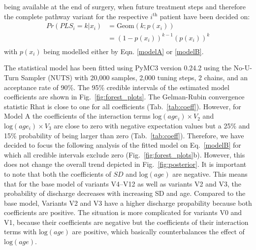  being available at the end of surgery, when future treatment steps and therefore the complete pathway variant for the respective $i^\text{th}$ patient have been decided on:
\begin{equation}
\begin{split}
Pr(PLS_i=k|x_i) & = \text{Geom}\left(k;p(x_i)\right) \\
& = \left(1-p(x_i)\right)^{k-1}\left(p(x_i)\right)^{k} \\
\end{split}
\end{equation}
with $p(x_i)$ being modelled either by Eqn. \eqref{modelA} or
\eqref{modelB}.
    
The statistical model has been fitted using PyMC3
\citep{Salvatier2016_PyMC3} version 0.24.2 using the No-U-Turn Sampler
(NUTS) with 20,000 samples, 2,000 tuning steps, 2 chains, and an
acceptance rate of 90\%. The 95\% credible intervals of the estimated
model coefficients are shown in Fig.~\ref{fig:forest_plots}. The
Gelman-Rubin convergence statistic Rhat is close to one for all
coefficients (Tab.~\ref{tab:coeff}). 
However, for Model A the coefficients of the interaction terms
$\text{log}(age_i)\times V_2$ and $\text{log}(age_i)\times V_3$ are
close to zero with negative expectation values but a 25\% and 15\%
probability of being larger than zero (Tab.~\ref{tab:coeff}). 
Therefore, we have decided to focus the following analysis of the
fitted model on Eq.~\ref{modelB} for which all credible intervals
exclude zero (Fig.~\ref{fig:forest_plots}b).
However, this does not change the overall trend depicted in Fig.~\ref{fig:posterior}.
It is important to note that both the coefficients of $SD$ and $\text{log}(age)$ are negative. This means that for the base model of variants V4--V12 as well as variants V2 and V3, the probability of discharge decreases with increasing SD and age. 
Compared to the base model, Variants V2 and V3 have a higher discharge propability because both coefficients are positive. 
The situation is more complicated for variants V0 and V1, because their coefficients are negative but the coefficients of their interaction terms with $\text{log}(age)$ are positive, which basically counterbalances the effect of $\text{log}(age)$.

